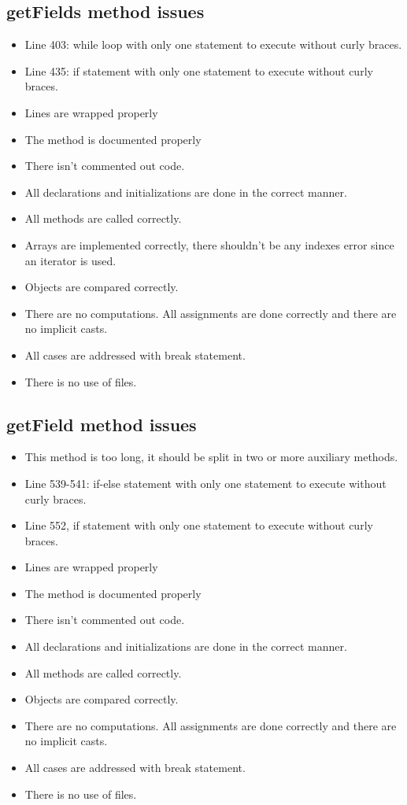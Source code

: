 \subsection{getFields method issues}
\begin{itemize}
	\item Line 403: while loop with only one statement to execute without curly braces.
	\item Line 435: if statement with only one statement to execute without curly braces.
	\item Lines are wrapped properly
	\item The method is documented properly
	\item There isn't commented out code.
	\item All declarations and initializations are done in the correct manner.
	\item All methods are called correctly.
	\item Arrays are implemented correctly, there shouldn't be any indexes error since an iterator is used.
	\item Objects are compared correctly.
	\item There are no computations. All assignments are done correctly and there are no implicit casts.
	\item All cases are addressed with break statement.
	\item There is no use of files.
\end{itemize}

\subsection{getField method issues}
\begin{itemize}
	\item This method is too long, it should be split in two or more auxiliary methods.
	\item Line 539-541: if-else statement with only one statement to execute without curly braces.
	\item Line 552, if statement with only one statement to execute without curly braces.
	\item Lines are wrapped properly
	\item The method is documented properly
	\item There isn't commented out code.
	\item All declarations and initializations are done in the correct manner.
	\item All methods are called correctly.
	\item Objects are compared correctly.
	\item There are no computations. All assignments are done correctly and there are no implicit casts.
	\item All cases are addressed with break statement.
	\item There is no use of files.
\end{itemize}

